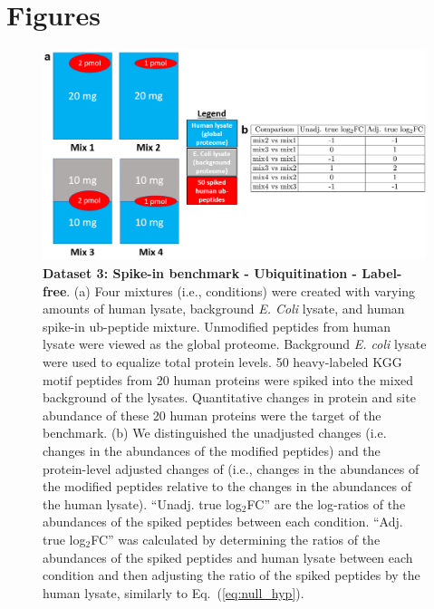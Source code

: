 \documentclass[mcp]{article}
\numberwithin{table}{section}
\def\eqref#1{Eq.~(\ref{eq:#1})}
\begin{document}
\newpage
\section{Figures}


\begin{figure}[ht]
\centering
\includegraphics[scale=.5]{images/benchmark_fig.png}
\caption{{\bf Dataset 3: Spike-in benchmark - Ubiquitination - Label-free}. 
%
(a) Four mixtures (i.e., conditions) were created with varying amounts of human lysate, background {\it E. Coli} lysate, and human spike-in ub-peptide mixture. Unmodified peptides from human lysate were viewed as the global proteome. Background {\it E. coli} lysate were used to equalize total protein levels. 50 heavy-labeled KGG motif peptides from 20 human proteins were spiked into the mixed background of the lysates. Quantitative changes in protein and site abundance of these 20 human proteins were the target of the benchmark.
%
(b)  We distinguished the unadjusted changes (i.e. changes in the abundances of the modified peptides) and the protein-level adjusted changes of (i.e., changes in the abundances of the modified peptides relative to the changes in the abundances of the human lysate).   ``Unadj. true log$_2$FC'' are the log-ratios of the abundances of the spiked peptides between each condition. ``Adj. true log$_2$FC'' was calculated by determining the ratios of the abundances of the spiked peptides and human lysate between each condition and then adjusting the ratio of the spiked peptides by the human lysate, similarly to \eqref{null_hyp}.}
\label{fig:benchmark-design}
\end{figure}
\end{document}
